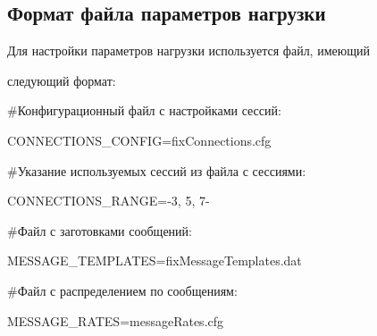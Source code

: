\vspace*{-6pt}





  \subsection{Формат файла параметров нагрузки}





  Для настройки параметров нагрузки используется файл, имеющий


сле\-ду\-ющий формат:





  \noindent


{\sf  \#Конфигурационный файл с настройками сессий:}





  \noindent


{\sf   CONNECTIONS\_CONFIG\;=\;fixConnections.cfg}





  \noindent


{\sf   \#Указание используемых сессий из файла с сессиями:}





  \noindent


{\sf   CONNECTIONS\_RANGE\;=-3, 5, 7-}





  \noindent


{\sf   \#Файл с заготовками сообщений:}





  \noindent


{\sf   MESSAGE\_TEMPLATES\;=\;fixMessageTemplates.dat}





  \noindent


{\sf   \#Файл с распределением по сообщениям:}





  \noindent


{\sf   MESSAGE\_RATES\;=\;messageRates.cfg}





  \noindent


